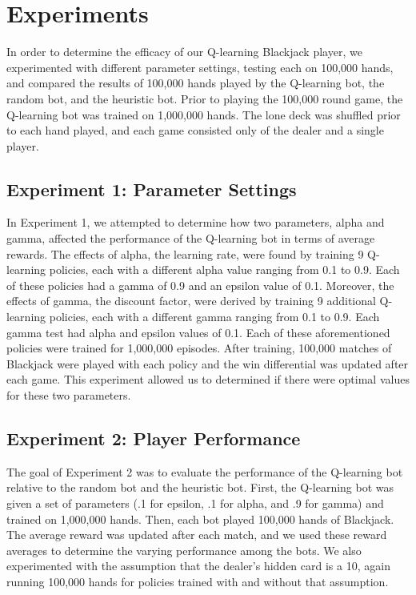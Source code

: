 
\section{Experiments}
\label{sec:expts}
In order to determine the efficacy of our Q-learning Blackjack player, we experimented with different parameter settings, testing each on 100,000 hands, and compared the results of 100,000 hands played by the Q-learning bot, the random bot, and the heuristic bot. Prior to playing the 100,000 round game, the Q-learning bot was trained on 1,000,000 hands. The lone deck was shuffled prior to each hand played, and each game consisted only of the dealer and a single player. 

\subsection{Experiment 1: Parameter Settings}
In Experiment 1, we attempted to determine how two parameters, alpha and gamma, affected the performance of the Q-learning bot in terms of average rewards. The effects of alpha, the learning rate, were found by training 9 Q-learning policies, each with a different alpha value ranging from 0.1 to 0.9. Each of these policies had a gamma of 0.9 and an epsilon value of 0.1. Moreover, the effects of gamma, the discount factor, were derived by training 9 additional Q-learning policies, each with a different gamma ranging from 0.1 to 0.9. Each gamma test had alpha and epsilon values of 0.1. Each of these aforementioned policies were trained for 1,000,000 episodes. After training, 100,000 matches of Blackjack were played with each policy and the win differential was updated after each game. This experiment allowed us to determined if there were optimal values for these two parameters. 

\subsection{Experiment 2: Player Performance}
The goal of Experiment 2 was to evaluate the performance of the Q-learning bot relative to the random bot and the heuristic bot. First, the Q-learning bot was given a set of parameters (.1 for epsilon, .1 for alpha, and .9 for gamma) and trained on 1,000,000 hands. Then, each bot played 100,000 hands of Blackjack. The average reward was updated after each match, and we used these reward averages to determine the varying performance among the bots. We also experimented with the assumption that the dealer's hidden card is a 10, again running 100,000 hands for policies trained with and without that assumption. 

